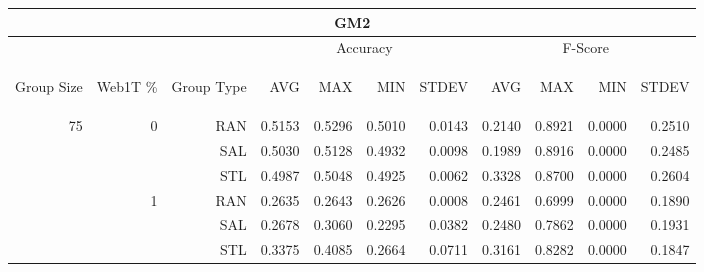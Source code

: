 \begin{center}
\begin{table}[htbp]
\begin{tabular}{ | r | r | r | r | r | r | r | r | r | r | r |}
\hline
\multicolumn{11}{|c|}{GM2}\\
\hline
 & & & \multicolumn{4}{|c|}{Accuracy} & \multicolumn{4}{|c|}{F-Score}\\ \cline{4-11}
\begin{sideways}Group Size\end{sideways} & \begin{sideways}Web1T \%\end{sideways} & \begin{sideways}Group Type\end{sideways} & \begin{sideways}AVG\end{sideways} & \begin{sideways}MAX\end{sideways} & \begin{sideways}MIN\end{sideways} & \begin{sideways}STDEV\end{sideways} & \begin{sideways}AVG\end{sideways} & \begin{sideways}MAX\end{sideways} & \begin{sideways}MIN\end{sideways} & \begin{sideways}STDEV\end{sideways}\\
\hline
\multirow{18}{*}{75}
 & \multirow{3}{*}{0} & RAN & 0.5153 & 0.5296 & 0.5010 & 0.0143 & 0.2140 & 0.8921 & 0.0000 & 0.2510\\ \cline{3-11}
 &   & SAL & 0.5030 & 0.5128 & 0.4932 & 0.0098 & 0.1989 & 0.8916 & 0.0000 & 0.2485\\ \cline{3-11}
 &   & STL & 0.4987 & 0.5048 & 0.4925 & 0.0062 & 0.3328 & 0.8700 & 0.0000 & 0.2604\\ \cline{2-11}
 & \multirow{3}{*}{1} & RAN & 0.2635 & 0.2643 & 0.2626 & 0.0008 & 0.2461 & 0.6999 & 0.0000 & 0.1890\\ \cline{3-11}
 &   & SAL & 0.2678 & 0.3060 & 0.2295 & 0.0382 & 0.2480 & 0.7862 & 0.0000 & 0.1931\\ \cline{3-11}
 &   & STL & 0.3375 & 0.4085 & 0.2664 & 0.0711 & 0.3161 & 0.8282 & 0.0000 & 0.1847\\ \cline{2-11}

\end{tabular}
\end{table}
\end{center}
